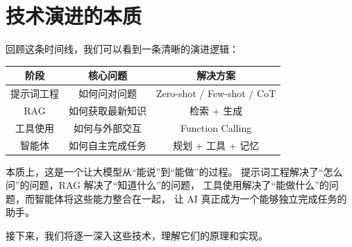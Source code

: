 \section*{技术演进的本质}

回顾这条时间线，我们可以看到一条清晰的演进逻辑：

\begin{center}
	\begin{tabular}{|c|c|c|}
		\hline
		\textbf{阶段} & \textbf{核心问题} & \textbf{解决方案}              \\
		\hline
		提示词工程       & 如何问对问题        & Zero-shot / Few-shot / CoT \\
		RAG         & 如何获取最新知识      & 检索 + 生成                    \\
		工具使用        & 如何与外部交互       & Function Calling           \\
		智能体         & 如何自主完成任务      & 规划 + 工具 + 记忆               \\
		\hline
	\end{tabular}
\end{center}

本质上，这是一个让大模型从“能说”到“能做”的过程。
提示词工程解决了“怎么问”的问题，RAG 解决了“知道什么”的问题，
工具使用解决了“能做什么”的问题，而智能体将这些能力整合在一起，
让 AI 真正成为一个能够独立完成任务的助手。

接下来，我们将逐一深入这些技术，理解它们的原理和实现。
